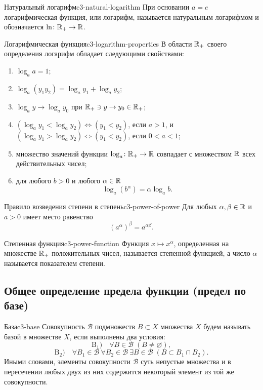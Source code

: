 \begin{definition}{Натуральный логарифм}{c3-natural-logarithm}
  При основании $a=e$ логарифмическая функция, или логарифм, называется
  натуральным логарифмом и обозначается $\ln\colon\mathbb{R}_+\to\mathbb{R}$.
\end{definition}

\begin{properties}{Логарифмическая функция}{c3-logarithm-properties}
  В области $\mathbb{R}_+$ своего определения логарифм обладает следующими
  свойствами:
  \begin{enumerate}[label=\arabic*${}^{\circ}$.]
    \item $\log_a a=1$;
    \item $\log_a(y_1y_2)=\log_a y_1+\log_a y_2$;
    \item $\log_a y\to\log_a y_0$ при $\mathbb{R}_+\ni y\to y_0\in\mathbb{R}_+$;
    \item $(\log_a y_1<\log_a y_2)\Leftrightarrow(y_1<y_2)$, если $a>1$,
      и $(\log_a y_1>\log_a y_2)\Leftrightarrow(y_1<y_2)$, если $0<a<1$;
    \item множество значений функции $\log_a\colon\mathbb{R}_+\to\mathbb{R}$ совпадает с
      множеством $\mathbb{R}$ всех действительных чисел;
    \item для любого $b>0$ и любого $\alpha\in\mathbb{R}$
      \[
        \log_a(b^\alpha)=\alpha\log_a b.
      \]
  \end{enumerate}
\end{properties}

\begin{properties}{Правило возведения степени в степень}{c3-power-of-power}
  Для любых $\alpha,\beta\in\mathbb{R}$ и $a>0$ имеет место равенство
  \[
    (a^\alpha)^\beta=a^{\alpha\beta}.
  \]
\end{properties}

\begin{definition}{Степенная функция}{c3-power-function}
  Функция $x\mapsto x^\alpha$, определенная на множестве $\mathbb{R}_+$
  положительных чисел, называется степенной функцией, а число $\alpha$
  называется показателем степени.
\end{definition}

\subsection{Общее определение предела функции (предел по базе)}

\begin{definition}{База}{c3-base}
  Совокупность $\mathcal B$ подмножеств $B\subset X$ множества $X$ будем
  называть базой в множестве $X$, если выполнены два условия:
  \[
    \mathrm{B}_1)\quad \forall B\in\mathcal B\;(B\ne\varnothing),
  \]
  \[
    \mathrm{B}_2)\quad
    \forall B_1\in\mathcal B\ \forall B_2\in\mathcal B\
    \exists B\in\mathcal B\;(B\subset B_1\cap B_2).
  \]
  Иными словами, элементы совокупности $\mathcal B$ суть непустые множества
  и в пересечении любых двух из них содержится некоторый элемент из той же
  совокупности.
\end{definition}

